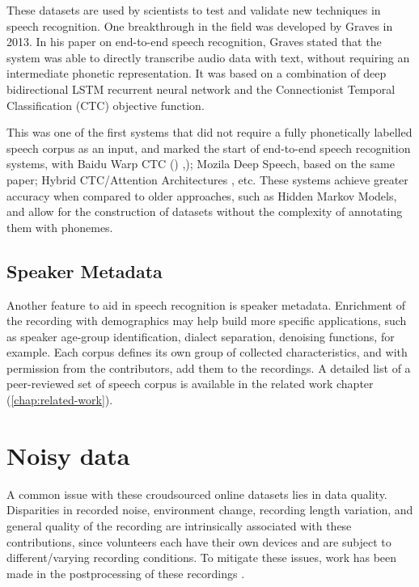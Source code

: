 These datasets are used by scientists to test and validate new techniques in speech recognition. One breakthrough in the field was developed by Graves \cite{graves2013speech} in 2013. In his paper on end-to-end speech recognition, Graves stated that the system was able to directly transcribe audio data with text, without requiring an intermediate phonetic representation. It was based on a combination of deep bidirectional LSTM recurrent neural network and the Connectionist Temporal Classification (CTC) objective function. 

This was one of the first systems that did not require a fully phonetically labelled speech corpus as an input, and marked the start of end-to-end speech recognition systems, with Baidu Warp CTC (\cite{hannun2014deep}) ,\cite{collobert2016wav2letter}); Mozila Deep Speech, based on the same paper; Hybrid CTC/Attention Architectures \cite{8068205}, etc. These systems achieve greater accuracy when compared to older approaches, such as Hidden Markov Models, and allow for the construction of datasets without the complexity of annotating them with phonemes.

\subsection{Speaker Metadata}

Another feature to aid in speech recognition is speaker metadata. Enrichment of the recording with demographics may help build more specific applications, such as speaker age-group identification, dialect separation, denoising functions, for example. Each corpus defines its own group of collected characteristics, and with permission from the contributors, add them to the recordings. A detailed list of a peer-reviewed set of speech corpus is available in the related work chapter (\ref{chap:related-work}).

\section{Noisy data}

A common issue with these croudsourced online datasets lies in data quality. Disparities in recorded noise, environment change, recording length variation, and general quality of the recording are intrinsically associated with these contributions, since volunteers each have their own devices and are subject to different/varying recording conditions. To mitigate these issues, work has been made in the postprocessing of these recordings \cite{krishna2019speech}.

